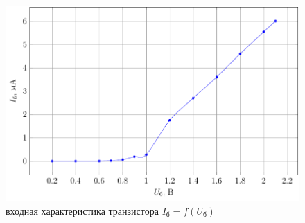 \begin{figure}[H]
	\centering
	\includegraphics[width=\linewidth]{plot/plot1}
	\caption{входная характеристика транзистора $I_\text{б}=f(U_\text{б})$}
	\label{fig:9}
\end{figure}
